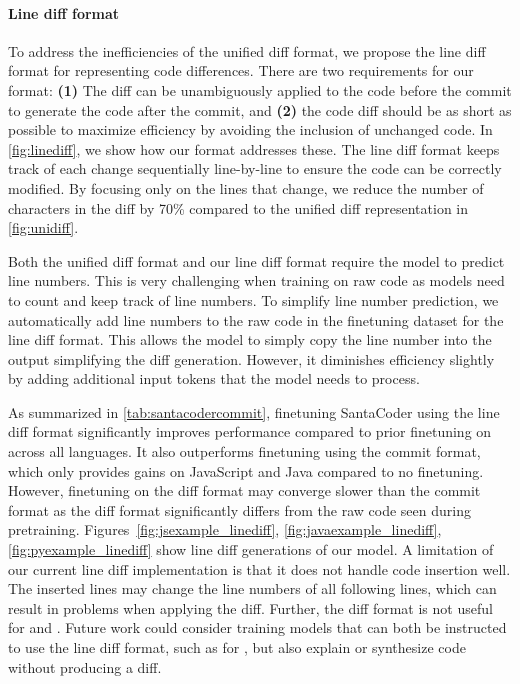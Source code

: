 \paragraph{Line diff format} To address the inefficiencies of the unified diff format, we propose the line diff format for representing code differences. There are two requirements for our format: \textbf{(1)} The diff can be unambiguously applied to the code before the commit to generate the code after the commit, and \textbf{(2)} the code diff should be as short as possible to maximize efficiency by avoiding the inclusion of unchanged code. In \autoref{fig:linediff}, we show how our format addresses these. The line diff format keeps track of each change sequentially line-by-line to ensure the code can be correctly modified. By focusing only on the lines that change, we reduce the number of characters in the diff by 70\% compared to the unified diff representation in \autoref{fig:unidiff}.

Both the unified diff format and our line diff format require the model to predict line numbers. This is very challenging when training on raw code as models need to count and keep track of line numbers. To simplify line number prediction, we automatically add line numbers to the raw code in the finetuning dataset for the line diff format. This allows the model to simply copy the line number into the output simplifying the diff generation. However, it diminishes efficiency slightly by adding additional input tokens that the model needs to process.

As summarized in \autoref{tab:santacodercommit}, finetuning SantaCoder using the line diff format significantly improves performance compared to prior finetuning on \evalf{} across all languages. It also outperforms finetuning using the commit format, which only provides gains on JavaScript and Java compared to no finetuning. However, finetuning on the diff format may converge slower than the commit format as the diff format significantly differs from the raw code seen during pretraining. Figures~\ref{fig:jsexample_linediff}, \ref{fig:javaexample_linediff}, \ref{fig:pyexample_linediff} show line diff generations of our model. A limitation of our current line diff implementation is that it does not handle code insertion well. The inserted lines may change the line numbers of all following lines, which can result in problems when applying the diff. Further, the diff format is not useful for \evale{} and \evals{}. Future work could consider training models that can both be instructed to use the line diff format, such as for \evalf{}, but also explain or synthesize code without producing a diff.

